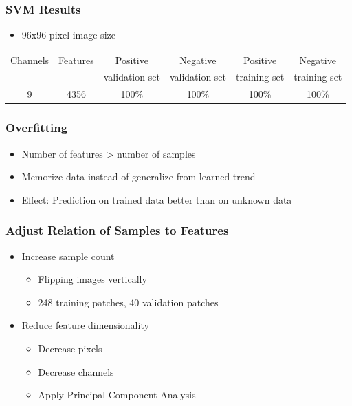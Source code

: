 \documentclass[serif,14pt]{beamer}
\begin{document}
\begin{frame}
  \frametitle{SVM Results}
        \begin{itemize}
			\item 96x96 pixel image size
		\end{itemize}
\begin{scriptsize}

  \begin{tabular}{| c | c | c | c | c | c |}
\hline


Channels & Features &  {Positive } & Negative  & Positive  & Negative \\

& & validation set & validation set & training set & training set \\
\hline

9 & 4356 & 100\% & 100\% & 100\% & 100\% \\

\hline

\end{tabular}

\end{scriptsize}




\end{frame}

\begin{frame}
  \frametitle{Overfitting}
    \begin{itemize}
		\item Number of features > number of samples
        \item Memorize data instead of generalize from learned trend
        \item Effect: Prediction on trained data better than on unknown data
	\end{itemize}
\end{frame}

\begin{frame}
  \frametitle{Adjust Relation of Samples to Features}
    \begin{itemize}
		\item Increase sample count
        	\begin{itemize}
				\item Flipping images vertically 
				\item 248 training patches, 40 validation patches
			\end{itemize}
    \vspace{0.5cm}
        \item Reduce feature dimensionality
        	\begin{itemize}
				\item Decrease pixels
				\item Decrease channels
				\item Apply Principal Component Analysis
			\end{itemize}
	\end{itemize}
\end{frame}
\end{document}
